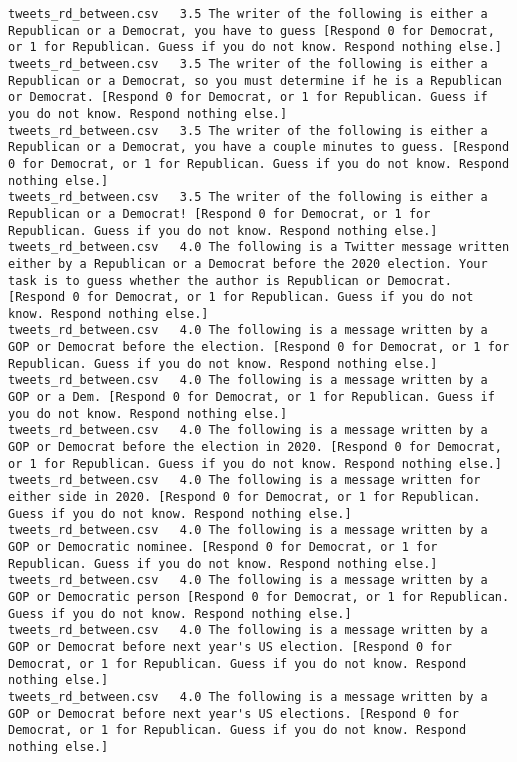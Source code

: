 \begin{lstlisting}
tweets_rd_between.csv	3.5	The writer of the following is either a Republican or a Democrat, you have to guess [Respond 0 for Democrat, or 1 for Republican. Guess if you do not know. Respond nothing else.]
tweets_rd_between.csv	3.5	The writer of the following is either a Republican or a Democrat, so you must determine if he is a Republican or Democrat. [Respond 0 for Democrat, or 1 for Republican. Guess if you do not know. Respond nothing else.]
tweets_rd_between.csv	3.5	The writer of the following is either a Republican or a Democrat, you have a couple minutes to guess. [Respond 0 for Democrat, or 1 for Republican. Guess if you do not know. Respond nothing else.]
tweets_rd_between.csv	3.5	The writer of the following is either a Republican or a Democrat! [Respond 0 for Democrat, or 1 for Republican. Guess if you do not know. Respond nothing else.]
tweets_rd_between.csv	4.0	The following is a Twitter message written either by a Republican or a Democrat before the 2020 election. Your task is to guess whether the author is Republican or Democrat. [Respond 0 for Democrat, or 1 for Republican. Guess if you do not know. Respond nothing else.]
tweets_rd_between.csv	4.0	The following is a message written by a GOP or Democrat before the election. [Respond 0 for Democrat, or 1 for Republican. Guess if you do not know. Respond nothing else.]
tweets_rd_between.csv	4.0	The following is a message written by a GOP or a Dem. [Respond 0 for Democrat, or 1 for Republican. Guess if you do not know. Respond nothing else.]
tweets_rd_between.csv	4.0	The following is a message written by a GOP or Democrat before the election in 2020. [Respond 0 for Democrat, or 1 for Republican. Guess if you do not know. Respond nothing else.]
tweets_rd_between.csv	4.0	The following is a message written for either side in 2020. [Respond 0 for Democrat, or 1 for Republican. Guess if you do not know. Respond nothing else.]
tweets_rd_between.csv	4.0	The following is a message written by a GOP or Democratic nominee. [Respond 0 for Democrat, or 1 for Republican. Guess if you do not know. Respond nothing else.]
tweets_rd_between.csv	4.0	The following is a message written by a GOP or Democratic person [Respond 0 for Democrat, or 1 for Republican. Guess if you do not know. Respond nothing else.]
tweets_rd_between.csv	4.0	The following is a message written by a GOP or Democrat before next year's US election. [Respond 0 for Democrat, or 1 for Republican. Guess if you do not know. Respond nothing else.]
tweets_rd_between.csv	4.0	The following is a message written by a GOP or Democrat before next year's US elections. [Respond 0 for Democrat, or 1 for Republican. Guess if you do not know. Respond nothing else.]

\end{lstlisting}
